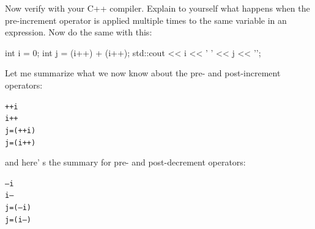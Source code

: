 
Now verify with your C++ compiler. Explain to yourself what happens when
the pre-increment operator is applied multiple times to the same
variable in an expression. Now do the same with this:
\begin{console}
int i = 0;
int j = (i++) + (i++);
std::cout << i << ' ' << j << '\n';
\end{console}

Let me summarize what we now know about the pre- and post-increment
operators:
\begin{flushleft}
\texttt{++i}\\
\texttt{i++}\\
\texttt{j=(++i)}\\
\texttt{j=(i++)}\\
\end{flushleft}
and here' s the summary for pre- and post-decrement
operators:
\begin{flushleft}
\texttt{--i}\\
\texttt{i--}\\
\texttt{j=(--i)}\\
\texttt{j=(i--)}\\
\end{flushleft}
